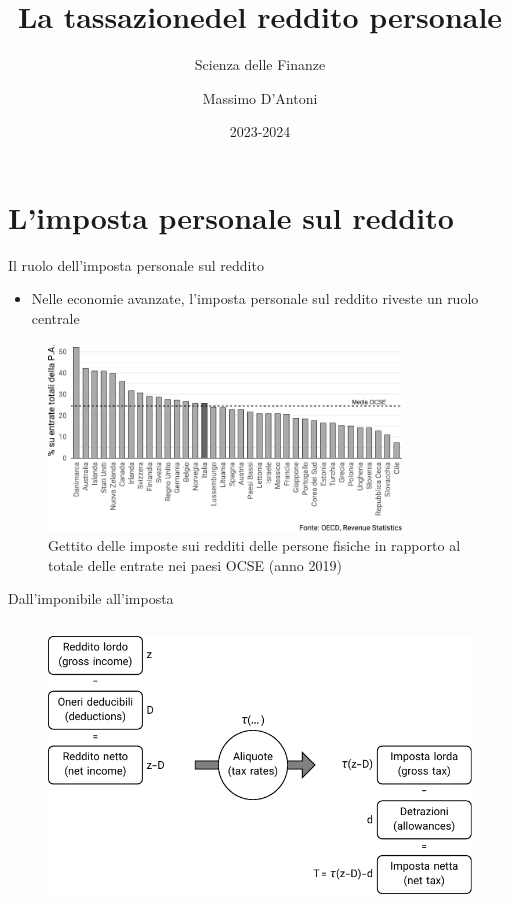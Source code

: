 \documentclass[aspectratio=64,11pt]{beamer}
\institute{Università di Siena}
\author{Massimo D'Antoni}
\date{2023-2024}
\title{La tassazione\newline del reddito personale}
\subtitle{Scienza delle Finanze}
\newcommand\€{\,\text{€}}
\begin{document}
\maketitle

\section{L'imposta personale sul reddito}

\begin{frame}{Il ruolo dell'imposta personale sul reddito}
\begin{itemize}
\item Nelle economie avanzate, l'imposta personale sul reddito riveste un ruolo
centrale
\end{itemize}

\begin{figure}
\centering
\includegraphics[height=5cm]{./figure/gettito-imposta-personale-OCSE.pdf}
\caption{Gettito delle imposte sui redditi delle persone fisiche in rapporto al totale delle entrate nei paesi OCSE (anno 2019)}
\end{figure}
\end{frame}

\begin{frame}{Dall'imponibile all'imposta}
\begin{figure}
\centering
\includegraphics[height=7.5cm]{./figure/da-reddito-a-imposta.pdf}
\end{figure}
\end{frame}
\end{document}
